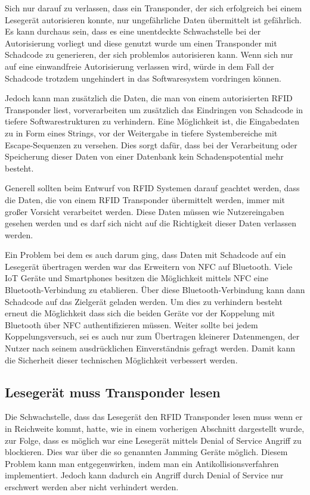 \documentclass[conference]{IEEEtran}
\begin{document}
Sich nur darauf zu verlassen, dass ein Transponder, der sich erfolgreich bei einem Lesegerät autorisieren konnte, nur ungefährliche Daten übermittelt ist gefährlich. Es kann durchaus sein, dass es eine unentdeckte Schwachstelle bei der Autorisierung vorliegt und diese genutzt wurde um einen Transponder mit Schadcode zu generieren, der sich problemlos autorisieren kann. Wenn sich nur auf eine einwandfreie Autorisierung verlassen wird, würde in dem Fall der Schadcode trotzdem ungehindert in das Softwaresystem vordringen können.

Jedoch kann man zusätzlich die Daten, die man von einem autorisierten RFID Transponder liest, vorverarbeiten um zusätzlich das Eindringen von Schadcode in tiefere Softwarestrukturen zu verhindern. Eine Möglichkeit ist, die Eingabedaten zu in Form eines Strings, vor der Weitergabe in tiefere Systembereiche mit Escape-Sequenzen zu versehen. Dies sorgt dafür, dass bei der Verarbeitung oder Speicherung dieser Daten von einer Datenbank kein Schadenspotential mehr besteht.

Generell sollten beim Entwurf von RFID Systemen darauf geachtet werden, dass die Daten, die von einem RFID Transponder übermittelt werden, immer mit großer Vorsicht verarbeitet werden. Diese Daten müssen wie Nutzereingaben gesehen werden und es darf sich nicht auf die Richtigkeit dieser Daten verlassen werden.

Ein Problem bei dem es auch darum ging, dass Daten mit Schadcode auf ein Lesegerät übertragen werden war das Erweitern von NFC auf Bluetooth. Viele IoT Geräte und Smartphones besitzen die Möglichkeit mittels NFC eine Bluetooth-Verbindung zu etablieren. Über diese Bluetooth-Verbindung kann dann Schadcode auf das Zielgerät geladen werden. Um dies zu verhindern besteht erneut die Möglichkeit dass sich die beiden Geräte vor der Koppelung mit Bluetooth über NFC authentifizieren müssen. Weiter sollte bei jedem Koppelungsversuch, sei es auch nur zum Übertragen kleinerer Datenmengen, der Nutzer nach seinem ausdrücklichen Einverständnis gefragt werden. Damit kann die Sicherheit dieser technischen Möglichkeit verbessert werden.

\subsection{Lesegerät muss Transponder lesen}
Die Schwachstelle, dass das Lesegerät den RFID Transponder lesen muss wenn er in Reichweite kommt, hatte, wie in einem vorherigen Abschnitt dargestellt wurde, zur Folge, dass es möglich war eine Lesegerät mittels Denial of Service Angriff zu blockieren. Dies war über die so genannten Jamming Geräte möglich. Diesem Problem kann man entgegenwirken, indem man ein Antikollisionsverfahren implementiert. Jedoch kann dadurch ein Angriff durch Denial of Service nur erschwert werden aber nicht verhindert werden.
\end{document}
